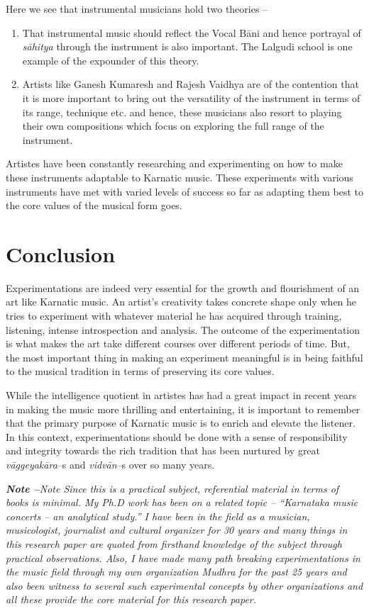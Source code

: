 Here we see that instrumental musicians hold two theories –

\begin{enumerate}
\itemsep=0pt
\item That instrumental music should reflect the Vocal Bāni and hence portrayal of \textit{sāhitya} through the instrument is also important. The Lalgudi school is one example of the expounder of this theory.

 \item Artists like Ganesh Kumaresh and Rajesh Vaidhya are of the contention that it is more important to bring out the versatility of the instrument in terms of its range, technique etc. and hence, these musicians also resort to playing their own compositions which focus on exploring the full range of the instrument.

\end{enumerate}

Artistes have been constantly researching and experimenting on how to make these instruments adaptable to Karnatic music. These experiments with various instruments have met with varied levels of success so far as adapting them best to the core values of the musical form goes.


\section*{Conclusion}

Experimentations are indeed very essential for the growth and flourishment of an art like Karnatic music. An artist’s creativity takes concrete shape only when he tries to experiment with whatever material he has acquired through training, listening, intense introspection and analysis. The outcome of the experimentation is what makes the art take different courses over different periods of time. But, the most important thing in making an experiment meaningful is in being faithful to the musical tradition in terms of preserving its core values.

While the intelligence quotient in artistes has had a great impact in recent years in making the music more thrilling and entertaining, it is important to remember that the primary purpose of Karnatic music is to enrich and elevate the listener. In this context, experimentations should be done with a sense of responsibility and integrity towards the rich tradition that has been nurtured by great \textit{vāggeyakāra}–s and \textit{vidvān}–s over so many years.

\textit{\textbf{Note –}Note Since this is a practical subject, referential material in terms of books is minimal. My Ph.D work has been on a related topic – “Karnataka music concerts – an analytical study.” I have been in the field as a musician, musicologist, journalist and cultural organizer for 30 years and many things in this research paper are quoted from firsthand knowledge of the subject through practical observations. Also, I have made many path breaking experimentations in the music field through my own organization Mudhra for the past 25 years and also been witness to several such experimental concepts by other organizations and all these provide the core material for this research paper.}


